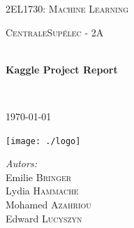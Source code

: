 \begin{titlepage}
\begin{center}


\LARGE \textsc{2EL1730: Machine Learning}

\vspace{0.2cm}

\Large \textsc{CentraleSupélec - 2A}

\vspace{0.3cm}

\HRule \\[0.4cm]

{\huge \bfseries Kaggle Project Report\\
[0.2cm]}

\HRule \\[0.4cm]

\vspace{2cm}

\textsc{\today}

\vspace{2cm}

\texttt{[image: ./logo]}~\\[3cm]

\begin{minipage}{0.4\textwidth}
\begin{spacing}{1.125}
\begin{flushleft} \Large
    \textit{Autors: } \\
 	Emilie \textsc{Bringer} \\
    Lydia \textsc{Hammache} \\
    Mohamed \textsc{Azahriou} \\
    Edward \textsc{Lucyszyn}
\end{flushleft}
\end{spacing}
\end{minipage}

\vfill

\end{center}
\end{titlepage}